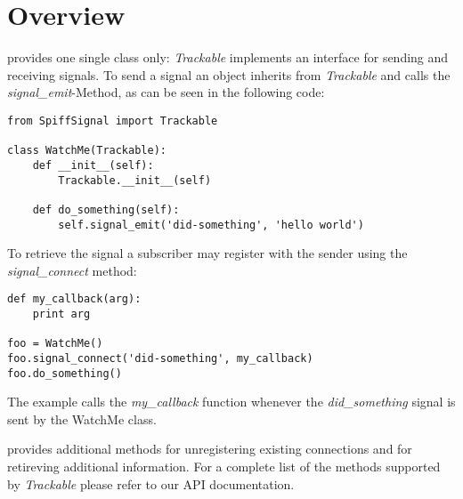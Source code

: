 

\newpage
\section{Overview}

\product provides one single class only: {\it Trackable} implements an 
interface for sending and receiving signals. To send a signal an object 
inherits from {\it Trackable} and calls the {\it signal\_emit}-Method, 
as can be seen in the following code:

\begin{lstlisting}
from SpiffSignal import Trackable

class WatchMe(Trackable):
    def __init__(self):
        Trackable.__init__(self)
    
    def do_something(self):
        self.signal_emit('did-something', 'hello world')
\end{lstlisting}

To retrieve the signal a subscriber may register with the sender 
using the {\it signal\_connect} method:

\begin{lstlisting}
def my_callback(arg):
    print arg

foo = WatchMe()
foo.signal_connect('did-something', my_callback)
foo.do_something()
\end{lstlisting}

The example calls the {\it my\_callback} function whenever the 
{\it did\_something} signal is sent by the WatchMe class.

\product provides additional methods for unregistering existing 
connections and for retireving additional information. For a complete 
list of the methods supported by {\it Trackable} please refer to our API 
documentation.

